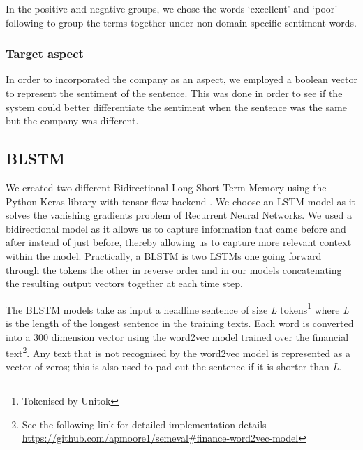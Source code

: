 \documentclass[11pt,a4paper]{article}
\begin{document}
In the positive and negative groups, we chose the words `excellent' and `poor' following \citet{turney2002thumbs} to group the terms together under non-domain specific sentiment words.
\subsubsection{Target aspect}
In order to incorporated the company as an aspect, we employed a boolean vector to represent the sentiment of the sentence. This was done in order to see if the system could better differentiate the sentiment when the sentence was the same but the company was different.

\subsection{BLSTM}
We created two different Bidirectional \cite{graves2005framewise} Long Short-Term Memory \cite{hochreiter1997long} using the Python Keras library \cite{chollet2015keras} with tensor flow backend \cite{abadi2016tensorflow}. We choose an LSTM model as it solves the vanishing gradients problem of Recurrent Neural Networks. We used a bidirectional model as it allows us to capture information that came before and after instead of just before, thereby allowing us to capture more relevant context within the model. Practically, a BLSTM is two LSTMs one going forward through the tokens the other in reverse order and in our models concatenating the resulting output vectors together at each time step. 

The BLSTM models take as input a headline sentence of size \textit{L} tokens\footnote{Tokenised by Unitok} where \textit{L} is the length of the longest sentence in the training texts. Each word is converted into a 300 dimension vector using the word2vec model trained over the financial text\footnote{See the following link for detailed implementation details \url{https://github.com/apmoore1/semeval\#finance-word2vec-model}}. Any text that is not recognised by the word2vec model is represented as a vector of zeros; this is also used to pad out the sentence if it is shorter than \textit{L}.
\end{document}
